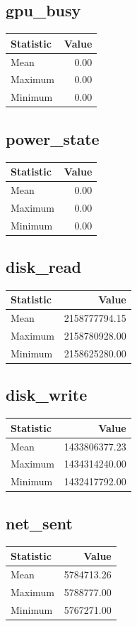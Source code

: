 \documentclass[11pt]{article}
\begin{document}
\subsection{gpu_busy}
\begin{tabular}{lr}
\toprule
Statistic & Value \\
\midrule
Mean & 0.00 \\
Maximum & 0.00 \\
Minimum & 0.00 \\
\bottomrule
\end{tabular}


\subsection{power_state}
\begin{tabular}{lr}
\toprule
Statistic & Value \\
\midrule
Mean & 0.00 \\
Maximum & 0.00 \\
Minimum & 0.00 \\
\bottomrule
\end{tabular}


\subsection{disk_read}
\begin{tabular}{lr}
\toprule
Statistic & Value \\
\midrule
Mean & 2158777794.15 \\
Maximum & 2158780928.00 \\
Minimum & 2158625280.00 \\
\bottomrule
\end{tabular}


\subsection{disk_write}
\begin{tabular}{lr}
\toprule
Statistic & Value \\
\midrule
Mean & 1433806377.23 \\
Maximum & 1434314240.00 \\
Minimum & 1432417792.00 \\
\bottomrule
\end{tabular}


\subsection{net_sent}
\begin{tabular}{lr}
\toprule
Statistic & Value \\
\midrule
Mean & 5784713.26 \\
Maximum & 5788777.00 \\
Minimum & 5767271.00 \\
\bottomrule
\end{tabular}
\end{document}
